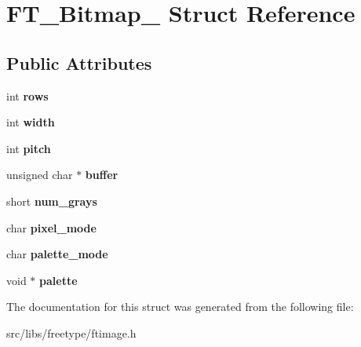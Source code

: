 \hypertarget{struct_f_t___bitmap__}{
\section{FT\_\-Bitmap\_\- Struct Reference}
\label{struct_f_t___bitmap__}
}
\subsection*{Public Attributes}
\begin{DoxyCompactItemize}
\item 
\hypertarget{struct_f_t___bitmap___a1b6bb20b30fe087e3fc87a0eb37730c0}{
int {\bfseries rows}}
\label{struct_f_t___bitmap___a1b6bb20b30fe087e3fc87a0eb37730c0}

\item 
\hypertarget{struct_f_t___bitmap___a7b5e6252dd91a3809fe80ebbeb6720eb}{
int {\bfseries width}}
\label{struct_f_t___bitmap___a7b5e6252dd91a3809fe80ebbeb6720eb}

\item 
\hypertarget{struct_f_t___bitmap___afdee595846e1188c7a76d0cec9d85cf2}{
int {\bfseries pitch}}
\label{struct_f_t___bitmap___afdee595846e1188c7a76d0cec9d85cf2}

\item 
\hypertarget{struct_f_t___bitmap___a76439b1d3c13b81ca506108cd1623284}{
unsigned char $\ast$ {\bfseries buffer}}
\label{struct_f_t___bitmap___a76439b1d3c13b81ca506108cd1623284}

\item 
\hypertarget{struct_f_t___bitmap___a415d78060f8012d312703c9792ec005a}{
short {\bfseries num\_\-grays}}
\label{struct_f_t___bitmap___a415d78060f8012d312703c9792ec005a}

\item 
\hypertarget{struct_f_t___bitmap___a5cc5e0fe42a93a86e16706ad52e087a2}{
char {\bfseries pixel\_\-mode}}
\label{struct_f_t___bitmap___a5cc5e0fe42a93a86e16706ad52e087a2}

\item 
\hypertarget{struct_f_t___bitmap___ae7c8c74255cd27873b12a360cd5f3884}{
char {\bfseries palette\_\-mode}}
\label{struct_f_t___bitmap___ae7c8c74255cd27873b12a360cd5f3884}

\item 
\hypertarget{struct_f_t___bitmap___a8d5ecf4409f71bfb559e0d13d8df4d86}{
void $\ast$ {\bfseries palette}}
\label{struct_f_t___bitmap___a8d5ecf4409f71bfb559e0d13d8df4d86}

\end{DoxyCompactItemize}


The documentation for this struct was generated from the following file:\begin{DoxyCompactItemize}
\item 
src/libs/freetype/ftimage.h\end{DoxyCompactItemize}

